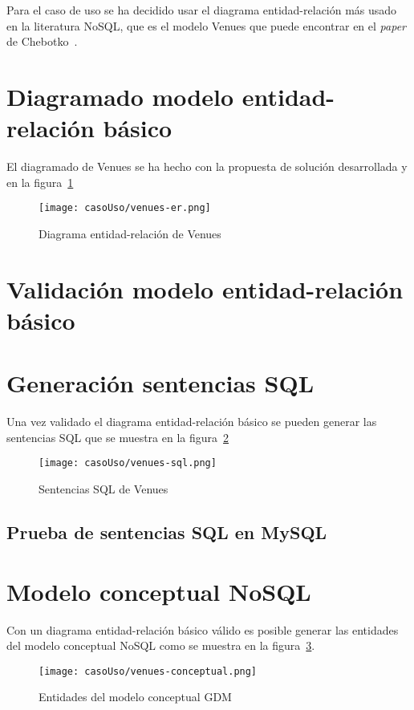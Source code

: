 Para el caso de uso se ha decidido usar el diagrama entidad-relación más usado en la literatura NoSQL, que es el modelo Venues que puede encontrar en el \textit{paper} de Chebotko~\cite{chebotko_big_2015}.

\section{Diagramado modelo entidad-relación básico}

El diagramado de Venues se ha hecho con la propuesta de solución desarrollada y en la figura~\ref{img:venues-er}

\begin{figure}[H]
    \centering
    \texttt{[image: casoUso/venues-er.png]}
    \caption{Diagrama entidad-relación de Venues}
    \label{img:venues-er}
\end{figure}

\section{Validación modelo entidad-relación básico}

\section{Generación sentencias SQL}
 Una vez validado el diagrama entidad-relación básico se pueden generar las sentencias SQL que se muestra en la figura~\ref{img:venues-sql} 

 \begin{figure}[H]
    \centering
    \texttt{[image: casoUso/venues-sql.png]}
    \caption{Sentencias SQL de Venues}
    \label{img:venues-sql}
\end{figure}

\subsection*{Prueba de sentencias SQL en MySQL}

\section{Modelo conceptual NoSQL}

Con un diagrama entidad-relación básico válido es posible generar las entidades del modelo conceptual NoSQL como se muestra en la figura~\ref{img:venues-conceptual}.

\begin{figure}[H]
    \centering
    \texttt{[image: casoUso/venues-conceptual.png]}
    \caption{Entidades del modelo conceptual GDM}
    \label{img:venues-conceptual}
\end{figure}

